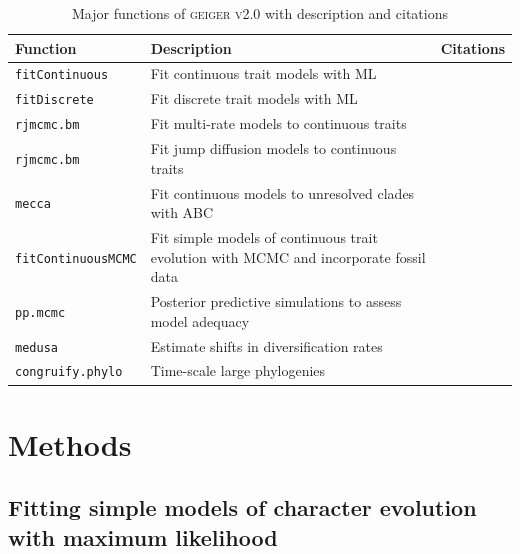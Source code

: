 \begin{table}
\centering
  \begin{tabular}{| p{3.5cm} | p{5.5cm} | p{4cm} |}
    \hline
    Function & Description & Citations \\ \hline
    \texttt{fitContinuous} & Fit continuous trait models with ML & \citet{Felsenstein1973, Hansen1997, Pagel1997, Pagel1999, Blomberg2003, Hunt2006, Harmon2010, FitzJohn2012} \\ \hline
    \texttt{fitDiscrete} & Fit discrete trait models with ML & \citet{Pagel1994, Lewis2001, FitzJohn2009} \\ \hline
    \texttt{rjmcmc.bm} & Fit multi-rate models to continuous traits & \citet{Eastman2011} \\ \hline
    \texttt{rjmcmc.bm} & Fit jump diffusion models to continuous traits & \citet{Eastmanjump} \\ \hline
    \texttt{mecca} & Fit continuous models to unresolved clades with ABC & \citet{Slater2012MECCA} \\ \hline
     \texttt{fitContinuousMCMC} & Fit simple models of continuous trait evolution with MCMC and incorporate fossil data & \citet{Slater2012Fossil} \\ \hline
     \texttt{pp.mcmc} & Posterior predictive simulations to assess model adequacy & \citet{SlaterPennell} \\ \hline
    \texttt{medusa} & Estimate shifts in diversification rates & \citet{Alfaro2009} \\ \hline
     \texttt{congruify.phylo} & Time-scale large phylogenies & \citet{Eastman2013} \\ \hline
  \end{tabular}
\caption[Major features of geiger v2.0]{Major functions of \textsc{geiger v2.0} with description and citations}
\label{tab:geiger-fxns}
\end{table}



\section{Methods}
\subsection{Fitting simple models of character evolution with maximum likelihood}

